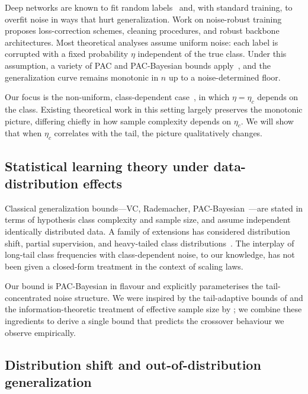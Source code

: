 \documentclass[11pt]{article}
\begin{document}
Deep networks are known to fit random labels~\cite{zhang2021understanding} and, with standard training, to overfit noise in ways that hurt generalization. Work on noise-robust training~\cite{song2022, northcutt2021, patrini2017} proposes loss-correction schemes, cleaning procedures, and robust backbone architectures. Most theoretical analyses assume uniform noise: each label is corrupted with a fixed probability $\eta$ independent of the true class. Under this assumption, a variety of PAC and PAC-Bayesian bounds apply~\cite{natarajan2013, scott2019}, and the generalization curve remains monotonic in $n$ up to a noise-determined floor.

Our focus is the non-uniform, class-dependent case~\cite{xia2019, cheng2020, berthon2021}, in which $\eta = \eta_c$ depends on the class. Existing theoretical work in this setting largely preserves the monotonic picture, differing chiefly in how sample complexity depends on $\eta_c$. We will show that when $\eta_c$ correlates with the tail, the picture qualitatively changes.

\subsection{Statistical learning theory under data-distribution effects}

Classical generalization bounds---VC, Rademacher, PAC-Bayesian~\cite{mcallester1999, shalev2014understanding}---are stated in terms of hypothesis class complexity and sample size, and assume independent identically distributed data. A family of extensions has considered distribution shift, partial supervision, and heavy-tailed class distributions~\cite{vapnik1998, dziugaite2017, arora2018}. The interplay of long-tail class frequencies with class-dependent noise, to our knowledge, has not been given a closed-form treatment in the context of scaling laws.

Our bound is PAC-Bayesian in flavour and explicitly parameterises the tail-concentrated noise structure. We were inspired by the tail-adaptive bounds of \citet{arora2018} and the information-theoretic treatment of effective sample size by \citet{russo2016}; we combine these ingredients to derive a single bound that predicts the crossover behaviour we observe empirically.

\subsection{Distribution shift and out-of-distribution generalization}
\end{document}

